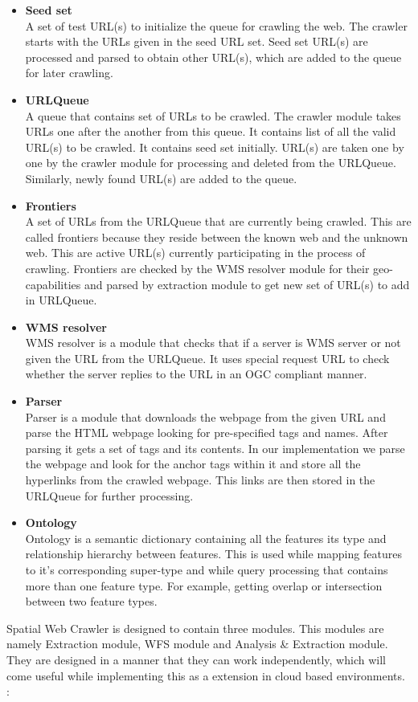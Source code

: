 \begin{itemize}

\item  \textbf{Seed set}\\ A set of test URL(s) to initialize the queue for crawling the web. The crawler
starts with the URLs given in the seed URL set. Seed set URL(s) are processed and parsed to obtain other URL(s), which are added to the queue for later crawling.

\item \textbf{URLQueue}\\
A queue that contains set of URLs to be crawled. The crawler module takes URLs one after the another from this queue. It contains list of all the valid URL(s) to be crawled. It contains seed set initially. URL(s) are taken one by one by the crawler module for processing and deleted from the URLQueue. Similarly, newly found URL(s) are added to the queue.

\item \textbf{Frontiers}\\ 
A set of URLs from the URLQueue that are currently being crawled. This are
called frontiers because they reside between the known web and the unknown web. This are active URL(s) currently participating in the process of crawling. Frontiers are checked by the WMS resolver module for their geo-capabilities and parsed by extraction module to get new set of URL(s) to add in URLQueue.

\item \textbf{WMS resolver}\\
WMS resolver is a module that checks that if a server is WMS server
or not given the URL from the URLQueue. It uses special request URL to check whether the server replies to the URL in an OGC compliant manner. 

\item \textbf{Parser}\\
Parser is a module that downloads the webpage from the given URL and parse
the HTML webpage looking for pre-specified tags and names. After parsing it gets a
set of tags and its contents. In our implementation we parse the webpage and look for
the anchor tags within it and store all the hyperlinks from the crawled webpage. This links are then stored in the URLQueue for further processing.

\item \textbf{Ontology}\\ 
Ontology is a semantic dictionary containing all the features its type and relationship
hierarchy between features. This is used while mapping features to it's corresponding super-type and while query processing that contains more than one feature type. For example, getting overlap or intersection between two feature types.

\end{itemize}
Spatial Web Crawler is designed to contain three modules. This modules are namely Extraction module, WFS module and Analysis \& Extraction module. They are designed in a manner that they can work independently, which will come useful while implementing this as a extension in cloud based environments. :

